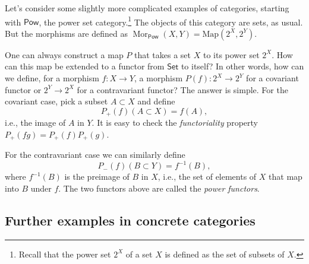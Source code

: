 \documentclass[english,letterpaper]{article}%
\numberwithin{equation}{section}
\numberwithin{figure}{section}
\numberwithin{table}{section}
\theoremstyle{definition}
\theoremstyle{definition}
\theoremstyle{definition}
\theoremstyle{plain}
\theoremstyle{plain}
\theoremstyle{plain}
\theoremstyle{plain}
\theoremstyle{remark}
\theoremstyle{remark}
\DeclareMathOperator{\mor}{Mor}
\begin{document}
%
\begin{example}
Let's consider some slightly more complicated examples of categories,
starting with $\mathsf{Pow}$, the power set category.\footnote{Recall that the power set $2^{X}$ of a set $X$ is defined as the
set of subsets of $X$.} The objects of this category are sets, as usual. But the morphisms
are defined as $\mor_{\mathsf{Pow}}(X,Y)=\text{Map}(2^{X},2^{Y})$.

One can always construct a map $P$ that takes a set $X$ to its power
set $2^{X}$. How can this map be extended to a functor from $\mathsf{Set}$
to itself? In other words, how can we define, for a morphism $f:X\rightarrow Y$,
a morphism $P(f):2^{X}\rightarrow2^{Y}$ for a covariant functor or
$2^{Y}\rightarrow2^{X}$ for a contravariant functor? The answer is
simple. For the covariant case, pick a subset $A\subset X$ and define
\begin{equation}
P_{+}(f)(A\subset X)=f(A),
\end{equation}
i.e., the image of $A$ in $Y$. It is easy to check the \emph{functoriality}
property $P_{+}\left(fg\right)=P_{+}\left(f\right)P_{+}\left(g\right)$.

For the contravariant case we can similarly define
\begin{equation}
P_{-}(f)(B\subset Y)=f^{-1}(B),
\end{equation}
where $f^{-1}(B)$ is the preimage of $B$ in $X$, i.e., the set
of elements of $X$ that map into $B$ under $f$. The two functors
above are called the \emph{power functors}.
\end{example}

\subsection{Further examples in concrete categories}
\end{document}
